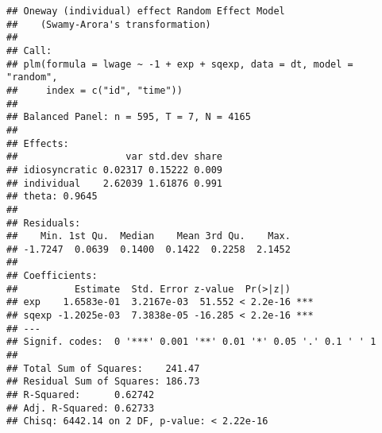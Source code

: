 \documentclass[
  12pt,
]{article}
\begin{document}
\begin{verbatim}
## Oneway (individual) effect Random Effect Model 
##    (Swamy-Arora's transformation)
## 
## Call:
## plm(formula = lwage ~ -1 + exp + sqexp, data = dt, model = "random", 
##     index = c("id", "time"))
## 
## Balanced Panel: n = 595, T = 7, N = 4165
## 
## Effects:
##                   var std.dev share
## idiosyncratic 0.02317 0.15222 0.009
## individual    2.62039 1.61876 0.991
## theta: 0.9645
## 
## Residuals:
##    Min. 1st Qu.  Median    Mean 3rd Qu.    Max. 
## -1.7247  0.0639  0.1400  0.1422  0.2258  2.1452 
## 
## Coefficients:
##          Estimate  Std. Error z-value  Pr(>|z|)    
## exp    1.6583e-01  3.2167e-03  51.552 < 2.2e-16 ***
## sqexp -1.2025e-03  7.3838e-05 -16.285 < 2.2e-16 ***
## ---
## Signif. codes:  0 '***' 0.001 '**' 0.01 '*' 0.05 '.' 0.1 ' ' 1
## 
## Total Sum of Squares:    241.47
## Residual Sum of Squares: 186.73
## R-Squared:      0.62742
## Adj. R-Squared: 0.62733
## Chisq: 6442.14 on 2 DF, p-value: < 2.22e-16
\end{verbatim}
\end{document}

